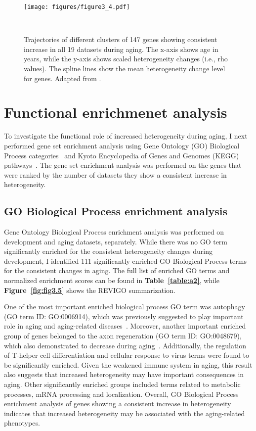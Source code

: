 \begin{figure}[!ht]
    \centering
    \texttt{[image: figures/figure3\_4.pdf]}
    \caption{Trajectories of different clusters of 147 genes showing consistent increase in all 19 datasets during aging.
    The x-axis shows age in years, while the y-axis shows scaled heterogeneity changes (i.e., rho values).
    The spline lines show the mean heterogeneity change level for genes. 
    Adapted from \autocite{Isildak2020}.
    }~\label{fig:fig3.4}
\end{figure}

\section{Functional enrichmenet analysis}
To investigate the functional role of increased heterogeneity during aging, 
I next performed gene set enrichment analysis using Gene Ontology (GO) Biological Process categories~\autocite{GO2019} and Kyoto Encyclopedia of Genes and Genomes (KEGG) pathways~\autocite{Kanehisa2019}.
The gene set enrichment analysis was performed on the genes that were ranked by the number of datasets they show a consistent increase in heterogeneity. 

\subsection{GO Biological Process enrichment analysis}
Gene Ontology Biological Process enrichment analysis was performed on development and aging datasets, separately. 
While there was no GO term significantly enriched for the consistent heterogeneity changes during development, 
I identified 111 significantly enriched GO Biological Process terms for the consistent changes in aging. 
The full list of enriched GO terms and normalized enrichment scores can be found in \textbf{Table~\ref{table:a2}}, 
while \textbf{Figure~\ref{fig:fig3.5}} shows the REVIGO summarization.

One of the most important enriched biological process GO term was autophagy (GO term ID: GO:0006914), which was previously suggested to play important role in aging and aging-related diseases~\autocite{Rubinsztein2011}.
Moreover, another important enriched group of genes belonged to the axon regeneration (GO term ID: GO:0048679), which also demonstrated to decrease during aging~\autocite{Belin2014}.
Additionally, the regulation of T-helper cell differentiation and cellular response to virus terms were found to be significantly enriched. 
Given the weakened immune system in aging, this result also suggests that increased heterogeneity may have important consequences in aging.
Other significantly enriched groups included terms related to metabolic processes, mRNA processing and localization.
Overall, GO Biological Process enrichment analysis of genes showing a consistent increase in heterogeneity indicates that increased heterogeneity may be associated with the aging-related phenotypes.

